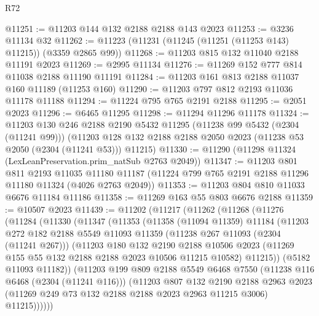 \begin{lexlean}{R72}
\begin{coremodule}
@11251 := @11203 @144 @132 @2188 @2188 @143 @2023
@11253 := @3236 @11134 @32
@11262 := @11223 (@11231 (@11245 (@11251 (@11253 @143) @11215)) (@3359 @2865 @99))
@11268 := @11203 @815 @132 @11040 @2188 @11191 @2023
@11269 := @2995 @11134
@11276 := @11269 @152 @777 @814 @11038 @2188 @11190 @11191
@11284 := @11203 @161 @813 @2188 @11037 @160 @11189 (@11253 @160)
@11290 := @11203 @797 @812 @2193 @11036 @11178 @11188
@11294 := @11224 @795 @765 @2191 @2188
@11295 := @2051 @2023
@11296 := @6465 @11295
@11298 := @11294 @11296 @11178
@11324 := @11203
    @130
    @246
    @2188
    @2190
    @5432
    @11295
    (@11238 @99 @5432 (@2304 (@11241 @99)))
    (@11203 @128 @132 @2188 @2188 @2050 @2023 (@11238 @53 @2050 (@2304 (@11241 @53))) @11215)
@11330 := @11290 (@11298 @11324 (LexLeanPreservation.prim_natSub @2763 @2049))
@11347 := @11203
    @801
    @811
    @2193
    @11035
    @11180
    @11187
    (@11224 @799 @765 @2191 @2188 @11296 @11180 @11324 (@4026 @2763 @2049))
@11353 := @11203 @804 @810 @11033 @6676 @11184 @11186
@11358 := @11269 @163 @55 @803 @6676 @2188
@11359 := @10507 @2023
@11439 := @11202
    (@11217
      (@11262
        (@11268
          (@11276
            (@11284
              (@11330
                (@11347
                  (@11353
                    (@11358
                      (@11094 @11359)
                      @11184
                      (@11203
                        @272
                        @182
                        @2188
                        @5549
                        @11093
                        @11359
                        (@11238 @267 @11093 (@2304 (@11241 @267)))
                        (@11203
                          @180
                          @132
                          @2190
                          @2188
                          @10506
                          @2023
                          (@11269 @155 @55 @132 @2188 @2188 @2023 @10506 @11215 @10582)
                          @11215))
                      (@5182 @11093 @11182))
                    (@11203
                      @199
                      @809
                      @2188
                      @5549
                      @6468
                      @7550
                      (@11238 @116 @6468 (@2304 (@11241 @116)))
                      (@11203
                        @807
                        @132
                        @2190
                        @2188
                        @2963
                        @2023
                        (@11269 @249 @73 @132 @2188 @2188 @2023 @2963 @11215 @3006)
                        @11215))))))

\end{coremodule}
\end{lexlean}
